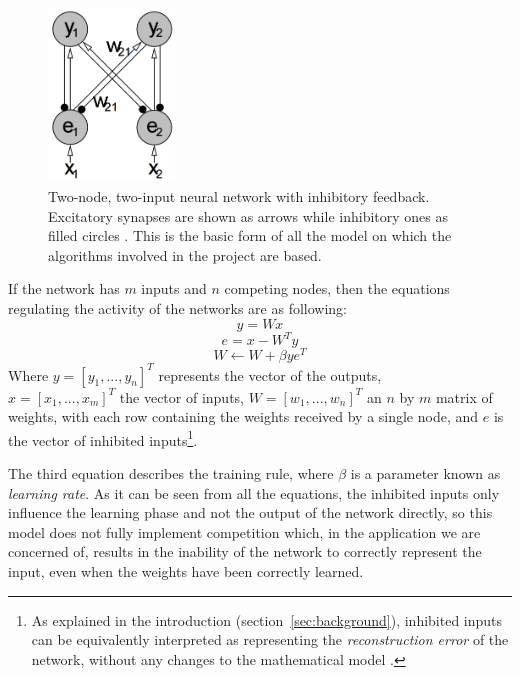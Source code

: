 \documentclass[11pt,a4paper]{report}
\begin{document}
				\newpage

				\begin{figure}[h]
					\centering
					\includegraphics[width=0.3\textwidth]{basictopology}
					\caption{Two-node, two-input neural network with inhibitory feedback. Excitatory synapses are shown as arrows while inhibitory ones as filled circles \cite{spratling2009unsupervised}. This is the basic form of all the model on which the algorithms involved in the project are based.}
					\label{fig:basictopology}
				\end{figure}

				If the network has $m$ inputs and $n$ competing nodes, then the equations regulating the activity of the networks are as following:
				\begin{equation}
					y = Wx
				\end{equation}
				\begin{equation}
					e = x - W^Ty
				\end{equation}
				\begin{equation}
					W \leftarrow W + \beta y e^T
				\end{equation}
				Where $y = [y_1, ..., y_n]^T$ represents the vector of the outputs,\\$x = [x_1, ..., x_m]^T$ the vector of inputs, $W = [w_1, ..., w_n]^T$ an $n$ by $m$ matrix of weights, with each row containing the weights received by a single node, and $e$ is the vector of inhibited inputs\footnote{As explained in the introduction (section~\ref{sec:background}), inhibited inputs can be equivalently interpreted as representing the \emph{reconstruction error} of the network, without any changes to the mathematical model \cite{spratling2009unsupervised}.}.
			
				The third equation describes the training rule, where $\beta$ is a parameter known as \emph{learning rate}. As it can be seen from all the equations, the inhibited inputs only influence the learning phase and not the output of the network directly, so this model does not fully implement competition which, in the application we are concerned of, results in the inability of the network to correctly represent the input, even when the weights have been correctly learned.
				
\end{document}
